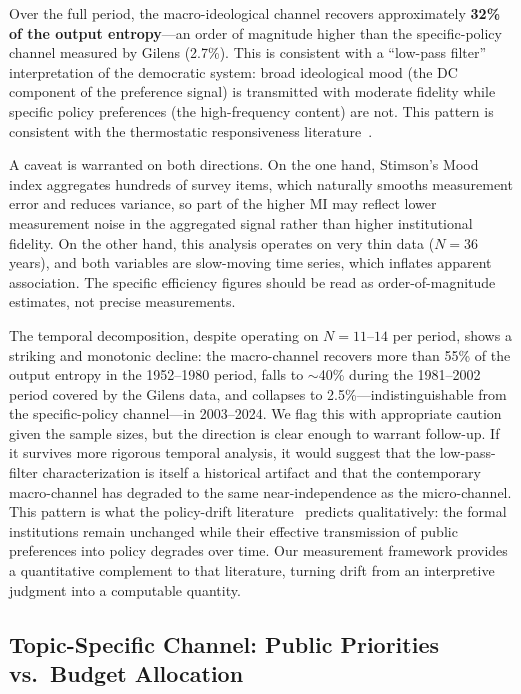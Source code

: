 \documentclass[twocolumn,10pt]{article}
\begin{document}
Over the full period, the macro-ideological channel recovers approximately \textbf{32\% of the output entropy}---an order of magnitude higher than the specific-policy channel measured by Gilens (2.7\%).  This is consistent with a ``low-pass filter'' interpretation of the democratic system: broad ideological mood (the DC component of the preference signal) is transmitted with moderate fidelity while specific policy preferences (the high-frequency content) are not.  This pattern is consistent with the thermostatic responsiveness literature~\citep{soroka2010}.

A caveat is warranted on both directions.  On the one hand, Stimson's Mood index aggregates hundreds of survey items, which naturally smooths measurement error and reduces variance, so part of the higher MI may reflect lower measurement noise in the aggregated signal rather than higher institutional fidelity.  On the other hand, this analysis operates on very thin data ($N=36$ years), and both variables are slow-moving time series, which inflates apparent association.  The specific efficiency figures should be read as order-of-magnitude estimates, not precise measurements.

The temporal decomposition, despite operating on $N=11$--$14$ per period, shows a striking and monotonic decline: the macro-channel recovers more than 55\% of the output entropy in the 1952--1980 period, falls to $\sim$40\% during the 1981--2002 period covered by the Gilens data, and collapses to 2.5\%---indistinguishable from the specific-policy channel---in 2003--2024.  We flag this with appropriate caution given the sample sizes, but the direction is clear enough to warrant follow-up.  If it survives more rigorous temporal analysis, it would suggest that the low-pass-filter characterization is itself a historical artifact and that the contemporary macro-channel has degraded to the same near-independence as the micro-channel.  This pattern is what the policy-drift literature~\citep{hacker2004,galvin2020} predicts qualitatively: the formal institutions remain unchanged while their effective transmission of public preferences into policy degrades over time.  Our measurement framework provides a quantitative complement to that literature, turning drift from an interpretive judgment into a computable quantity.

\subsection{Topic-Specific Channel: Public Priorities vs.\ Budget Allocation}
\end{document}
